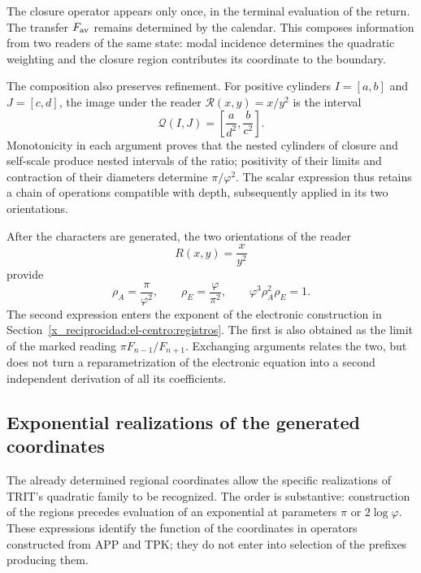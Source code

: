 The closure operator appears only once, in the terminal evaluation
of the return. The transfer \(F_{\rm av}\) remains determined
by the calendar. This composes information from two readers of the
same state: modal incidence determines the quadratic weighting
and the closure region contributes its coordinate to the boundary.

The composition also preserves refinement. For positive cylinders
\(I=[a,b]\) and \(J=[c,d]\), the image under the reader
\(\mathcal R(x,y)=x/y^2\) is the interval
\[
 \mathcal Q(I,J)=\left[\frac{a}{d^2},\frac{b}{c^2}\right].
\]
Monotonicity in each argument proves that the nested cylinders of
closure and self-scale produce nested intervals of the ratio;
positivity of their limits and contraction of their diameters determine
\(\pi/\varphi^2\). The scalar expression thus retains a chain
of operations compatible with depth, subsequently applied in
its two orientations.



After the characters are generated, the two orientations of the reader
\[
 R(x,y)=\frac{x}{y^2}
\]
provide
\begin{equation}
 \rho_A=\frac\pi{\varphi^2},\qquad
 \rho_E=\frac\varphi{\pi^2},\qquad
 \varphi^3\rho_A^2\rho_E=1.
 \label{x_reciprocidad:eq:areal-electron}
\end{equation}
The second expression enters the exponent of the electronic construction in Section~\ref{x_reciprocidad:el-centro:registros}. The first is also obtained as the limit of the marked reading \(\pi F_{n-1}/F_{n+1}\). Exchanging arguments relates the two, but does not turn a reparametrization of the electronic equation into a second independent derivation of all its coefficients.


\subsection{Exponential realizations of the generated coordinates}
\label{x_reciprocidad:euler-trit-articulacion}

The already determined regional coordinates allow the specific
realizations of TRIT's quadratic family to be recognized. The order is
substantive: construction of the regions precedes evaluation of an
exponential at parameters \(\pi\) or \(2\log\varphi\). These expressions
identify the function of the coordinates in operators constructed from
APP and TPK; they do not enter into selection of the prefixes producing them.


